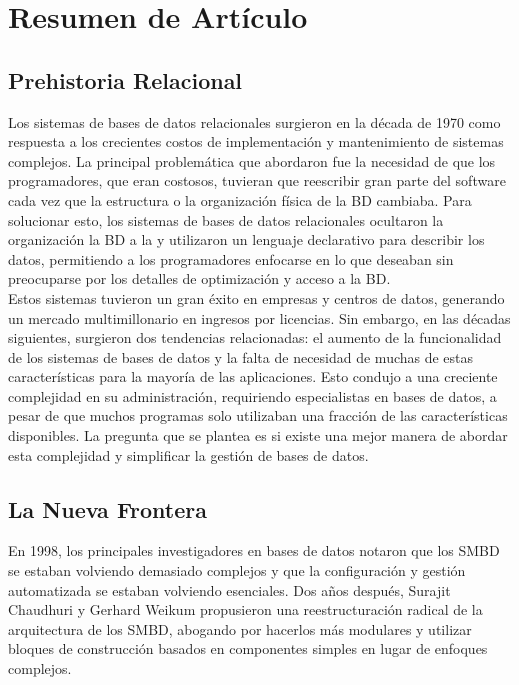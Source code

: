 \documentclass[12pt]{article}
\begin{document}


\section*{Resumen de Artículo}

    \subsection{Prehistoria Relacional}

        Los sistemas de bases de datos relacionales surgieron en la década de 1970 como respuesta a los crecientes costos de implementación y mantenimiento de sistemas complejos. La principal problemática que abordaron fue la necesidad de que los programadores, que eran costosos, tuvieran que reescribir gran parte del software cada vez que la estructura o la organización física de la BD cambiaba. Para solucionar esto, los sistemas de bases de datos relacionales ocultaron la organización la BD a la y utilizaron un lenguaje declarativo para describir los datos, permitiendo a los programadores enfocarse en lo que deseaban sin preocuparse por los detalles de optimización y acceso a la BD.\\

        Estos sistemas tuvieron un gran éxito en empresas y centros de datos, generando un mercado multimillonario en ingresos por licencias. Sin embargo, en las décadas siguientes, surgieron dos tendencias relacionadas: el aumento de la funcionalidad de los sistemas de bases de datos y la falta de necesidad de muchas de estas características para la mayoría de las aplicaciones. Esto condujo a una creciente complejidad en su administración, requiriendo especialistas en bases de datos, a pesar de que muchos programas solo utilizaban una fracción de las características disponibles. La pregunta que se plantea es si existe una mejor manera de abordar esta complejidad y simplificar la gestión de bases de datos.\\

    \subsection{La Nueva Frontera}

        En 1998, los principales investigadores en bases de datos notaron que los SMBD se estaban volviendo demasiado complejos y que la configuración y gestión automatizada se estaban volviendo esenciales. Dos años después, Surajit Chaudhuri y Gerhard Weikum propusieron una reestructuración radical de la arquitectura de los SMBD, abogando por hacerlos más modulares y utilizar bloques de construcción basados en componentes simples en lugar de enfoques complejos.\\
\end{document}
